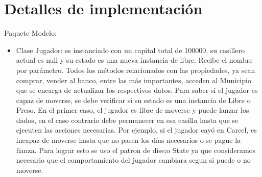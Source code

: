 \documentclass[titlepage,a4paper]{article}
\begin{document}
\section{Detalles de implementación}\label{sec:detallesdeimplementacion}

Paquete Modelo:

\begin{itemize}
\item 
Clase Jugador: es instanciado con un capital total de 100000, su casillero actual es null y su estado es una nueva instancia de libre. Recibe el nombre por parámetro. Todos los métodos relacionados con las propiedades, ya sean comprar, vender al banco, entre las más importantes, acceden al Municipio que se encarga de actualizar los respectivos datos. Para saber si el jugador es capaz de moverse, se debe verificar si su estado es una instancia de Libre o Preso. En el primer caso, el jugador es libre de moverse y puede lanzar los dados, en el caso contrario debe permanecer en esa casilla hasta que se ejecuten las acciones necesarias. Por ejemplo, si el jugador cayó en Carcel, es incapaz de moverse hasta que no pasen los días necesarios o se pague la fianza. Para lograr esto se uso el patron de dise;o State ya que consideramos necesario que el comportamiento del jugador cambiara segun si puede o no moverse.
\end{itemize}
\end{document}
